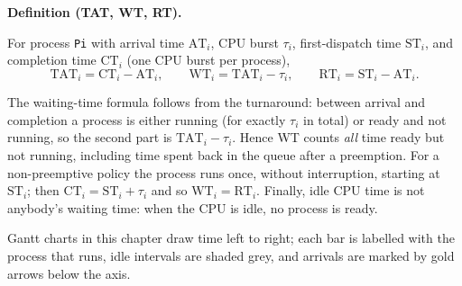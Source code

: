 \documentclass[11pt]{article}
\newenvironment{definitionbox}[1]{%
  \par\noindent\textbf{Definition (#1).}\ \itshape
}{\par\vspace{0.3em}}
\begin{document}
\begin{definitionbox}{TAT, WT, RT}
For process \texttt{Pi} with arrival time $\mathrm{AT}_i$, CPU burst $\tau_i$,
first-dispatch time $\mathrm{ST}_i$, and completion time $\mathrm{CT}_i$ (one
CPU burst per process),
\[
  \mathrm{TAT}_i = \mathrm{CT}_i - \mathrm{AT}_i, \qquad
  \mathrm{WT}_i = \mathrm{TAT}_i - \tau_i, \qquad
  \mathrm{RT}_i = \mathrm{ST}_i - \mathrm{AT}_i .
\]
\end{definitionbox}

The waiting-time formula follows from the turnaround: between arrival and
completion a process is either running (for exactly $\tau_i$ in total) or ready
and not running, so the second part is $\mathrm{TAT}_i - \tau_i$. Hence WT
counts \emph{all} time ready but not running, including time spent back in the
queue after a preemption. For a non-preemptive policy the process runs once,
without interruption, starting at $\mathrm{ST}_i$; then
$\mathrm{CT}_i = \mathrm{ST}_i + \tau_i$ and so $\mathrm{WT}_i = \mathrm{RT}_i$.
Finally, idle CPU time is not anybody's waiting time: when the CPU is idle, no
process is ready.

Gantt charts in this chapter draw time left to right; each bar is labelled with
the process that runs, idle intervals are shaded grey, and arrivals are marked
by gold arrows below the axis.
\end{document}
